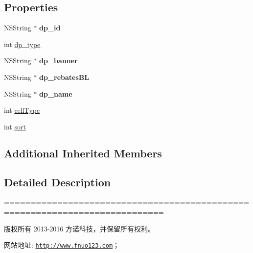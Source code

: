 \subsection*{Properties}
\begin{DoxyCompactItemize}
\item 
\mbox{\label{interface_brand_sales_view_controller_afa1d0f8ea5ddd1e956be7f09ac91671c}} 
N\+S\+String $\ast$ {\bfseries dp\+\_\+id}
\item 
int \mbox{\hyperlink{interface_brand_sales_view_controller_a04a03dfaefd09bc2535273cfa8ac1a4e}{dp\+\_\+type}}
\item 
\mbox{\label{interface_brand_sales_view_controller_abf66fd5fad2d0dd2a6d4c917157f9cc9}} 
N\+S\+String $\ast$ {\bfseries dp\+\_\+banner}
\item 
\mbox{\label{interface_brand_sales_view_controller_a0bdb222ca41007da30a8fdce72c00bbd}} 
N\+S\+String $\ast$ {\bfseries dp\+\_\+rebates\+BL}
\item 
\mbox{\label{interface_brand_sales_view_controller_a88d45e2899389852a14ecb10ab8f17c6}} 
N\+S\+String $\ast$ {\bfseries dp\+\_\+name}
\item 
int \mbox{\hyperlink{interface_brand_sales_view_controller_a16d9076af11cf8249e266c2d26a7e2f2}{cell\+Type}}
\item 
int \mbox{\hyperlink{interface_brand_sales_view_controller_ac86606f7936c5695aee9cfe0c399caa5}{sort}}
\end{DoxyCompactItemize}
\subsection*{Additional Inherited Members}


\subsection{Detailed Description}
============================================================================

版权所有 2013-\/2016 方诺科技，并保留所有权利。

网站地址\+: \href{http://www.fnuo123.com}{\tt http\+://www.\+fnuo123.\+com}； 



